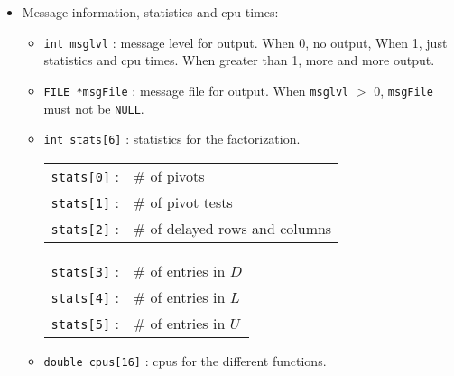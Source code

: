 \begin{itemize}
\begin{itemize}
{\tt int nthread} : number of threads to be used during the factor and
solve.
\item
{\tt int lookahead} : this parameter is used to possibly reduce the
idle time of threads during the factorization.
When {\tt lookahead} is 0, the factorization uses the least amount
of working storage but threads can be idle.
Larger values of {\tt lookahead} tend to increase the working
storage but may decrease the execution time.
Values of {\tt lookahead} greater than {\tt nthread} are not useful.
\item
{\tt IV *ownersIV} : this object contains the map from fronts to
their owning processors.
\item
{\tt SolveMap *solvemap} : this object contains the map from factor
submatrices to their owning processors.
\item
{\tt DV *cumopsDV} : this object is formed when the map from
fronts to owning processors is created.
Its size is {\tt nthread} and contains the operations that each
thread will perform during a direct factorization without pivoting.
\end{itemize}
%
\item Message information, statistics and cpu times:
\begin{itemize}
\item
{\tt int msglvl} : message level for output.
When 0, no output, When 1, just statistics and cpu times.
When greater than 1, more and more output.
\item
{\tt FILE *msgFile} : message file for output.
When \texttt{msglvl} $>$ 0, \texttt{msgFile} must not be \texttt{NULL}.
\item
{\tt int stats[6]} : statistics for the factorization.
\begin{center}
\begin{tabular}{ll}
\texttt{stats[0]} : & \# of pivots \\
\texttt{stats[1]} : & \# of pivot tests \\
\texttt{stats[2]} : & \# of delayed rows and columns
\end{tabular}
\begin{tabular}{ll}
\texttt{stats[3]} : & \# of entries in $D$ \\
\texttt{stats[4]} : & \# of entries in $L$ \\
\texttt{stats[5]} : & \# of entries in $U$
\end{tabular}
\end{center}
\item
{\tt double cpus[16]} : cpus for the different functions.

\end{itemize}
\end{itemize}
